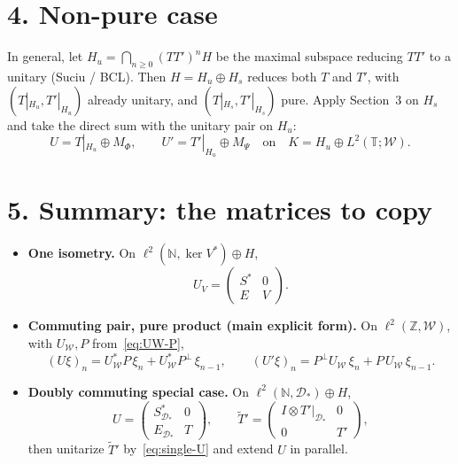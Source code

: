 \documentclass[11pt]{article}
\begin{document}
\bigskip
\section*{4. Non-pure case}

In general, let \(H_u=\bigcap_{n\ge 0}(TT')^n H\) be the maximal subspace reducing \(TT'\) to a
unitary (Suciu / BCL). Then \(H=H_u\oplus H_s\) reduces both \(T\) and \(T'\), with
\((T|_{H_u},T'|_{H_u})\) already unitary, and \((T|_{H_s},T'|_{H_s})\) pure. Apply
Section~3 on \(H_s\) and take the direct sum with the unitary pair on \(H_u\):
\[
U=T|_{H_u}\oplus M_{\Phi},
\qquad
U'=T'|_{H_u}\oplus M_{\Psi}
\quad\text{on}\quad
K=H_u\oplus L^2(\mathbb{T};\mathcal{W}).
\]

\bigskip
\section*{5. Summary: the matrices to copy}

\begin{itemize}
\item \textbf{One isometry.} On \(\ell^2(\mathbb{N},\ker V^*)\oplus H\),
\[
U_V=\begin{pmatrix}S^*&0\\ E&V\end{pmatrix}.
\]

\item \textbf{Commuting pair, pure product (main explicit form).} On
\(\ell^2(\mathbb{Z},\mathcal{W})\), with \(U_{\mathcal{W}},P\) from~\eqref{eq:UW-P},
\[
(U\xi)_n=U_{\mathcal{W}}^*P\,\xi_n+U_{\mathcal{W}}^*P^\perp\,\xi_{n-1},
\qquad
(U'\xi)_n=P^\perp U_{\mathcal{W}}\,\xi_n+P\,U_{\mathcal{W}}\,\xi_{n-1}.
\]

\item \textbf{Doubly commuting special case.} On
\(\ell^2(\mathbb{N},\mathcal{D}_*)\oplus H\),
\[
U=\begin{pmatrix}S_{\mathcal{D}_*}^*&0\\ E_{\mathcal{D}_*}&T\end{pmatrix},
\qquad
\widetilde{T}'=\begin{pmatrix}I\otimes T'|_{\mathcal{D}_*}&0\\ 0&T'\end{pmatrix},
\]
then unitarize \(\widetilde{T}'\) by~\eqref{eq:single-U} and extend \(U\) in parallel.
\end{itemize}
\end{document}
